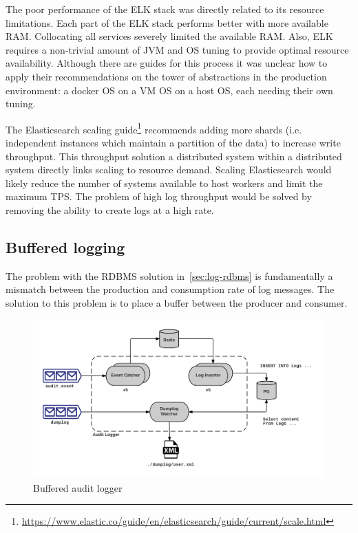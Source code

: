 The poor performance of the ELK stack was directly related to its resource limitations.
Each part of the ELK stack performs better with more available RAM.
Collocating all services severely limited the available RAM.
Also, ELK requires a non-trivial amount of JVM and OS tuning to provide optimal resource availability.
Although there are guides for this process it was unclear how to apply their recommendations on the tower of abstractions in the production environment: a docker OS on a VM OS on a host OS, each needing their own tuning.

The Elasticsearch scaling guide\footnote{\url{https://www.elastic.co/guide/en/elasticsearch/guide/current/scale.html}} recommends adding more shards (i.e. independent instances which maintain a partition of the data) to increase write throughput.
This throughput solution \textemdash{} a distributed system within a distributed system \textemdash{} directly links scaling to resource demand.
Scaling Elasticsearch would likely reduce the number of systems available to host workers and limit the maximum TPS.
The problem of high log throughput would be solved by removing the ability to create logs at a high rate.

\subsection{Buffered logging}\label{sec:log-buf}
The problem with the RDBMS solution in~\ref{sec:log-rdbms} is fundamentally a mismatch between the production and consumption rate of log messages.
The solution to this problem is to place a buffer between the producer and consumer.

\begin{figure}[tbph]
  \centering
  \includegraphics[width=0.95\linewidth]{graphics/arch-audit}
  \caption{Buffered audit logger}
  \label{fig:audit}
\end{figure}

